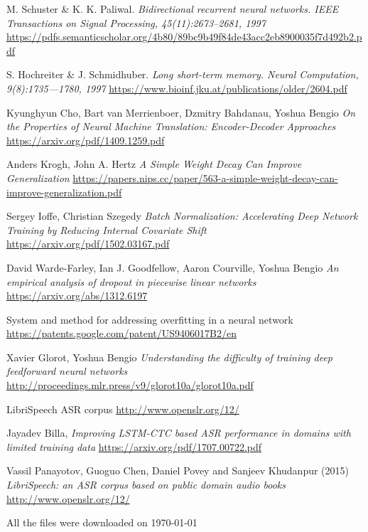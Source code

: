 \documentclass[licencjacka,en]{pracamgr}
\newcommand{\bibDownloadDate}{\today}
\begin{document}
\begin{thebibliography}{99}
		 M. Schuster \& K. K. Paliwal. \textit{Bidirectional recurrent neural networks. IEEE Transactions on Signal Processing, 45(11):2673–2681, 1997} \href{https://pdfs.semanticscholar.org/4b80/89bc9b49f84de43acc2eb8900035f7d492b2.pdf}{https://pdfs.semanticscholar.org/4b80/89bc9b49f84de43acc2eb8900035f7d492b2.pdf}
		
		 S. Hochreiter \& J. Schmidhuber. \textit{Long short-term memory. Neural Computation, 9(8):1735—1780, 1997} \href{https://www.bioinf.jku.at/publications/older/2604.pdf}{https://www.bioinf.jku.at/publications/older/2604.pdf}
		
		 Kyunghyun Cho, Bart van Merrienboer, Dzmitry Bahdanau, Yoshua Bengio \textit{On the Properties of Neural Machine Translation: Encoder-Decoder Approaches} \href{https://arxiv.org/pdf/1409.1259.pdf}{https://arxiv.org/pdf/1409.1259.pdf}
		
		 Anders Krogh, John A. Hertz \textit{A Simple Weight Decay Can Improve Generalization} \href{https://papers.nips.cc/paper/563-a-simple-weight-decay-can-improve-generalization.pdf}{https://papers.nips.cc/paper/563-a-simple-weight-decay-can-improve-generalization.pdf}
		
		 Sergey Ioffe, Christian Szegedy \textit{Batch Normalization: Accelerating Deep Network Training by Reducing Internal Covariate Shift} \href{https://arxiv.org/pdf/1502.03167.pdf}{https://arxiv.org/pdf/1502.03167.pdf}
		
		 David Warde-Farley, Ian J. Goodfellow, Aaron Courville, Yoshua Bengio \textit{An empirical analysis of dropout in piecewise linear networks
		} \href{https://arxiv.org/abs/1312.6197}{https://arxiv.org/abs/1312.6197}
		
		 System and method for addressing overfitting in a neural network \href{https://patents.google.com/patent/US9406017B2/en}{https://patents.google.com/patent/US9406017B2/en}
		
		 Xavier Glorot, Yoshua Bengio \textit{Understanding the difficulty of training deep feedforward neural networks} \href{http://proceedings.mlr.press/v9/glorot10a/glorot10a.pdf}{http://proceedings.mlr.press/v9/glorot10a/glorot10a.pdf}
		
		 LibriSpeech ASR corpus \href{http://www.openslr.org/12/}{http://www.openslr.org/12/}
		
		 Jayadev Billa, \textit{Improving LSTM-CTC based ASR performance in domains with limited training data}
		\href{https://arxiv.org/pdf/1707.00722.pdf}{https://arxiv.org/pdf/1707.00722.pdf}
		
		 Vassil Panayotov, Guoguo Chen, Daniel Povey and Sanjeev Khudanpur (2015) \textit{LibriSpeech: an ASR corpus based on public domain audio books} 
		\href{http://www.openslr.org/12/}{http://www.openslr.org/12/}
		
	\end{thebibliography}
	All the files were downloaded on \bibDownloadDate
	
\end{document}
